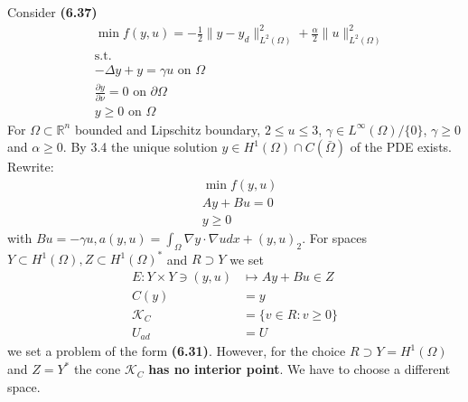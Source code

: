 \begin{example}
Consider \textbf{(6.37)}
\begin{align*}
	&\min f(y, u) =  - \frac{1}{2} \|y - y_d\|_{L^2(\Omega)}^2 + \frac{\alpha}{2}\|u\|^2_{L^2(\Omega)}\\
	&\text{s.t.} \\
	& -\Delta y + y = \gamma u \text{ on } \Omega\\
	& \frac{\partial y}{\partial \nu} = 0 \text{ on } \partial \Omega\\
	& y \ge 0 \text{ on } \Omega 
\end{align*}	
For $\Omega \subset \mathbb{R}^n$ bounded and Lipschitz boundary, $2 \le u \le 3$, $\gamma \in L^\infty(\Omega)\slash \{0\}$, $\gamma \geq 0$ and $\alpha \geq 0$. By 3.4 the unique solution $y \in H^1(\Omega) \cap C(\bar{\Omega})$ of the PDE exists. Rewrite:
\begin{align*}
	&\min f(y, u) \\
	&Ay + Bu = 0\\
	 &y \ge 0
\end{align*}
with $Bu = -\gamma u, a(y, u) = \int_\Omega \nabla y \cdot \nabla u dx + (y, u)_2$. 
For spaces $Y \subset H^1(\Omega), Z \subset H^1(\Omega)^*$ and $R \supset Y$ we set
\begin{align*}
	E: Y \times Y \ni (y, u) &\mapsto Ay + Bu \in Z\\
	C(y) &= y\\
	\mathcal{K}_C &= \{v \in R: v \geq 0\}\\
	U_{ad} &= U
\end{align*}
we set a problem of the form \textbf{(6.31)}. However, for the choice $R \supset Y = H^1(\Omega)$ and $Z = Y^*$ the cone $\mathcal{K}_C$ \textbf{has no interior point}. We have to choose a different space.



\end{example}
